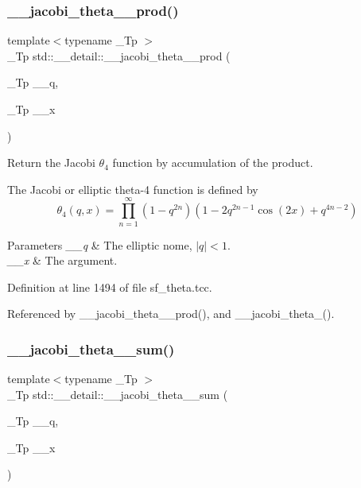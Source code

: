 \subsubsection{\texorpdfstring{\+\_\+\+\_\+jacobi\+\_\+theta\+\_\+\_\+prod()}{\_\_jacobi\_theta\_4\_prod()}}
{\footnotesize\ttfamily template$<$typename \+\_\+\+Tp $>$ \\
\+\_\+\+Tp std\+::\+\_\+\+\_\+detail\+::\+\_\+\+\_\+jacobi\+\_\+theta\+\_\+\_\+prod (\begin{DoxyParamCaption}\item[{\+\_\+\+Tp}]{\+\_\+\+\_\+q,  }\item[{\+\_\+\+Tp}]{\+\_\+\+\_\+x }\end{DoxyParamCaption})}

Return the Jacobi $ \theta_4 $ function by accumulation of the product.

The Jacobi or elliptic theta-\/4 function is defined by \[ \theta_4(q,x) = \prod_{n=1}^{\infty} (1 - q^{2n})(1 - 2q^{2n-1}\cos(2x) + q^{4n-2}) \]


\begin{DoxyParams}{Parameters}
{\em \+\_\+\+\_\+q} & The elliptic nome, $ |q| < 1 $. \\
\hline
{\em \+\_\+\+\_\+x} & The argument. \\
\hline
\end{DoxyParams}


Definition at line 1494 of file sf\+\_\+theta.\+tcc.



Referenced by \+\_\+\+\_\+jacobi\+\_\+theta\+\_\+\_\+prod(), and \+\_\+\+\_\+jacobi\+\_\+theta\+\_().

\mbox{\label{namespacestd_1_1____detail_a6f1dd356335537ad693089ccb8d8c755}} 
\subsubsection{\texorpdfstring{\+\_\+\+\_\+jacobi\+\_\+theta\+\_\+\_\+sum()}{\_\_jacobi\_theta\_4\_sum()}}
{\footnotesize\ttfamily template$<$typename \+\_\+\+Tp $>$ \\
\+\_\+\+Tp std\+::\+\_\+\+\_\+detail\+::\+\_\+\+\_\+jacobi\+\_\+theta\+\_\+\_\+sum (\begin{DoxyParamCaption}\item[{\+\_\+\+Tp}]{\+\_\+\+\_\+q,  }\item[{\+\_\+\+Tp}]{\+\_\+\+\_\+x }\end{DoxyParamCaption})}

